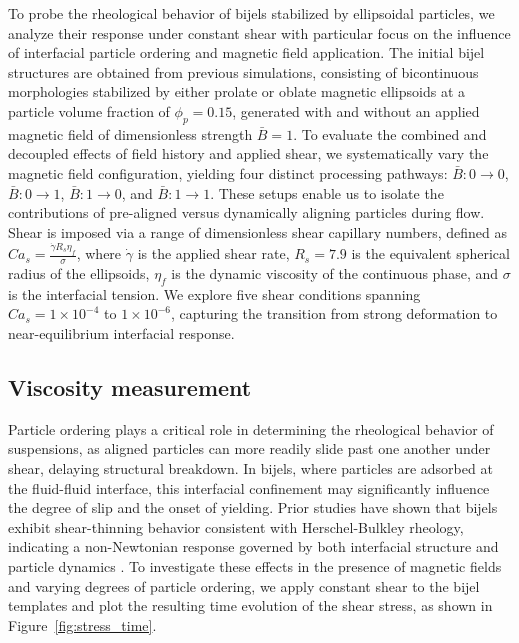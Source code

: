 To probe the rheological behavior of bijels stabilized by ellipsoidal particles, we analyze their response under constant shear with particular focus on the influence of interfacial particle ordering 
and magnetic field application. The initial bijel structures are obtained from previous simulations, consisting of bicontinuous morphologies stabilized by either prolate or oblate magnetic 
ellipsoids at a particle volume fraction of $\phi_p = 0.15$, generated with and without an applied magnetic field of dimensionless strength $\bar{B} = 1$. To evaluate the combined and decoupled effects 
of field history and applied shear, we systematically vary the magnetic field configuration, yielding four distinct processing pathways: 
$\bar{B}:0 \rightarrow 0$, $\bar{B}:0 \rightarrow 1$, $\bar{B}:1 \rightarrow 0$, and $\bar{B}:1 \rightarrow 1$. These setups enable us to isolate the contributions of pre-aligned versus dynamically aligning 
particles during flow. Shear is imposed via a range of dimensionless shear capillary numbers, defined as $Ca_s = \frac{\dot{\gamma} R_s \eta_f}{\sigma}$, where $\dot{\gamma}$ is the applied shear rate, 
$R_s = 7.9$ is the equivalent spherical radius of the ellipsoids, $\eta_f$ is the dynamic viscosity of the continuous phase, and $\sigma$ is the interfacial tension. 
\cite{frijters_effects_2012, yang_capillary_2022} We explore five shear conditions spanning $Ca_s = 1 \times 10^{-4}$ to $1 \times 10^{-6}$, capturing the transition from strong deformation to 
near-equilibrium interfacial response.

\subsection{Viscosity measurement}

Particle ordering plays a critical role in determining the rheological behavior of suspensions, as aligned particles can more readily slide past one another 
under shear, delaying structural breakdown. In bijels, where particles are adsorbed at the fluid-fluid interface, this interfacial confinement may significantly 
influence the degree of slip and the onset of yielding. Prior studies have shown that bijels exhibit shear-thinning behavior consistent with Herschel-Bulkley rheology, 
indicating a non-Newtonian response governed by both interfacial structure and particle dynamics \cite{macmillan_rheological_2019}. To investigate these effects in 
the presence of magnetic fields and varying degrees of particle ordering, we apply constant shear to the bijel templates and plot the resulting time evolution of 
the shear stress, as shown in Figure~\ref{fig:stress_time}.

